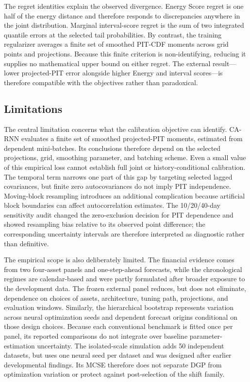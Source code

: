 \documentclass[11pt]{article}
\begin{document}
The regret identities explain the observed divergence. Energy Score regret is
one half of the energy distance and therefore responds to discrepancies anywhere
in the joint distribution. Marginal interval-score regret is the sum of two
integrated quantile errors at the selected tail probabilities. By contrast, the
training regularizer averages a finite set of smoothed PIT-CDF moments across
grid points and projections. Because this finite criterion is non-identifying,
reducing it supplies no mathematical upper bound on either regret. The external
result---lower projected-PIT error alongside higher Energy and interval
scores---is therefore compatible with the objectives rather than paradoxical.

\subsection{Limitations}

The central limitation concerns what the calibration objective can identify.
CA-RNN evaluates a finite set of smoothed projected-PIT moments, estimated from
dependent mini-batches. Its conclusions therefore depend on the selected
projections, grid, smoothing parameter, and batching scheme. Even a small value
of this empirical loss cannot establish full joint or history-conditional
calibration. The temporal term narrows one part of this gap by targeting selected
lagged covariances, but finite zero autocovariances do not imply PIT independence.
Moving-block resampling introduces an additional complication because artificial
block boundaries can affect autocorrelation estimates. The 10/20/40-day
sensitivity audit changed the zero-exclusion decision for PIT dependence and
showed resampling bias relative to its observed point difference; the
corresponding uncertainty intervals are therefore interpreted as diagnostic
rather than definitive.

The empirical scope is also deliberately limited. The financial evidence comes
from two four-asset panels and one-step-ahead forecasts, while the chronological
regimes are calendar-based and were partly formulated after broader exposure to
the development data. The frozen external panel reduces, but does not eliminate,
dependence on choices of assets, architecture, tuning path, projections, and
evaluation windows. Similarly, the hierarchical bootstrap represents variation
across neural optimization seeds and dependent forecast origins conditional on
those design choices. Because each conventional benchmark is fitted once per
panel, its reported comparisons do not integrate over baseline parameter-
estimation uncertainty. The isolated-scale simulation adds 50 independent
datasets, but uses one neural seed per dataset and was designed after earlier
developmental findings. Its MCSE therefore does not separate DGP from
optimization variation or protect against post-selection of the shift family.
\end{document}
